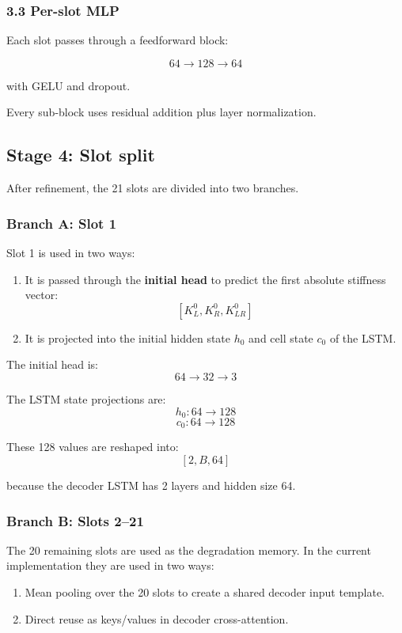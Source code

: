 \documentclass[11pt,a4paper]{article}
\begin{document}
\subsubsection*{3.3 Per-slot MLP}
Each slot passes through a feedforward block:

$$
64 \rightarrow 128 \rightarrow 64
$$

with GELU and dropout.

Every sub-block uses residual addition plus layer normalization.

\subsection*{Stage 4: Slot split}
After refinement, the 21 slots are divided into two branches.

\subsubsection*{Branch A: Slot 1}
Slot 1 is used in two ways:

\begin{enumerate}[nosep]
    \item It is passed through the \textbf{initial head} to predict the first absolute stiffness vector:
    $$
    [K_L^0, K_R^0, K_{LR}^0]
    $$
    \item It is projected into the initial hidden state $h_0$ and cell state $c_0$ of the LSTM.
\end{enumerate}

The initial head is:
$$
64 \rightarrow 32 \rightarrow 3
$$

The LSTM state projections are:
$$
h_0: 64 \rightarrow 128
$$
$$
c_0: 64 \rightarrow 128
$$

These 128 values are reshaped into:
$$
[2, B, 64]
$$

because the decoder LSTM has 2 layers and hidden size 64.

\subsubsection*{Branch B: Slots 2--21}
The 20 remaining slots are used as the degradation memory. In the current implementation they are used in two ways:

\begin{enumerate}[nosep]
    \item Mean pooling over the 20 slots to create a shared decoder input template.
    \item Direct reuse as keys/values in decoder cross-attention.
\end{enumerate}
\end{document}
